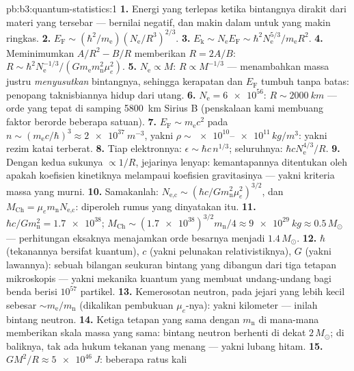 \begin{solution}{pb:b3:quantum-statistics:1}
\textbf{1.} Energi yang terlepas ketika bintangnya dirakit dari materi
yang tersebar --- bernilai negatif, dan makin dalam untuk yang makin ringkas.
\textbf{2.} $E_{\text{F}} \sim (\hbar^2/m_{\text{e}})
(N_{\text{e}}/R^3)^{2/3}$.
\textbf{3.} $E_{\text{k}} \sim N_{\text{e}}E_{\text{F}} \sim
\hbar^2N_{\text{e}}^{5/3}/m_{\text{e}}R^2$.
\textbf{4.} Meminimumkan $A/R^2 - B/R$ memberikan $R = 2A/B$: $R \sim
\hbar^2N_{\text{e}}^{-1/3}/(Gm_{\text{e}}m_{\text{n}}^2\mu_e^2)$.
\textbf{5.} $N_{\text{e}} \propto M$: $R \propto M^{-1/3}$ ---
menambahkan massa justru \emph{menyusutkan} bintangnya, sehingga
kerapatan dan $E_{\text{F}}$
tumbuh tanpa batas: penopang taknisbiannya hidup dari utang.
\textbf{6.} $N_{\text{e}} = \num{6e56}$: $R \sim \qty{2000}{km}$
--- orde yang tepat di samping \qty{5800}{km} Sirius B (penskalaan kami
membuang faktor berorde beberapa satuan).
\textbf{7.} $E_{\text{F}} \sim m_{\text{e}}c^2$ pada $n \sim
(m_{\text{e}}c/\hbar)^3 \approx \qty{2e37}{m^{-3}}$, yakni $\rho
\sim \num{e10}$--$\num{e11}\,\unit{kg/m^3}$: yakni rezim katai
terberat.
\textbf{8.} Tiap elektronnya: $\epsilon \sim \hbar c\,n^{1/3}$;
seluruhnya: $\hbar cN_{\text{e}}^{4/3}/R$.
\textbf{9.} Dengan kedua sukunya $\propto 1/R$, jejarinya lenyap:
kemantapannya ditentukan oleh apakah koefisien kinetiknya melampaui
koefisien gravitasinya --- yakni kriteria massa yang murni.
\textbf{10.} Samakanlah: $N_{\text{e,c}} \sim (\hbar c/
Gm_{\text{n}}^2\mu_e^2)^{3/2}$, dan $M_{\text{Ch}} =
\mu_em_{\text{n}}N_{\text{e,c}}$: diperoleh rumus yang dinyatakan itu.
\textbf{11.} $\hbar c/Gm_{\text{n}}^2 = \num{1.7e38}$;
$M_{\text{Ch}} \sim (\num{1.7e38})^{3/2}m_{\text{n}}/4 \approx
\qty{9e29}{kg} \approx 0.5\,M_\odot$ --- perhitungan eksaknya
menajamkan orde besarnya menjadi $1.4\,M_\odot$.
\textbf{12.} $\hbar$ (tekanannya bersifat kuantum), $c$ (yakni
pelunakan relativistiknya), $G$ (yakni lawannya): sebuah bilangan
seukuran bintang yang dibangun dari tiga tetapan mikroskopis --- yakni
mekanika kuantum yang membuat undang-undang bagi benda berisi $10^{57}$ partikel.
\textbf{13.} Kemerosotan neutron, pada jejari yang lebih kecil sebesar
$\sim m_{\text{e}}/m_{\text{n}}$ (dikalikan pembukuan $\mu_e$-nya):
yakni kilometer --- inilah bintang neutron.
\textbf{14.} Ketiga tetapan yang sama dengan $m_{\text{n}}$ di
mana-mana memberikan skala massa yang sama: bintang neutron berhenti di
dekat $2\,M_\odot$; di baliknya, tak ada hukum tekanan yang menang ---
yakni lubang hitam.
\textbf{15.} $GM^2/R \approx \qty{5e46}{J}$: beberapa ratus kali

\end{solution}
